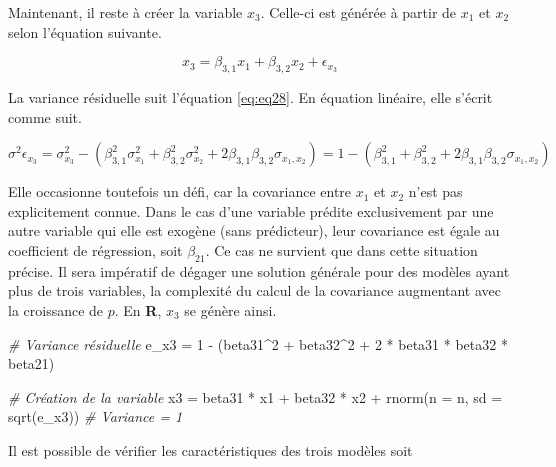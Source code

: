 \documentclass[
]{book}
\newenvironment{Shaded}{}{}
\newcommand{\AttributeTok}[1]{#1}
\newcommand{\CommentTok}[1]{\textit{#1}}
\newcommand{\DecValTok}[1]{#1}
\newcommand{\FunctionTok}[1]{#1}
\newcommand{\NormalTok}[1]{#1}
\newcommand{\OtherTok}[1]{#1}
\newcommand{\SpecialCharTok}[1]{#1}
\begin{document}
Maintenant, il reste à créer la variable \(x_3\). Celle-ci est générée à partir de \(x_1\) et \(x_2\) selon l'équation suivante.

\[
x_3 = \beta_{3,1}x_1 + \beta_{3,2}x_2 + \epsilon_{x_3}
\]

La variance résiduelle suit l'équation \eqref{eq:eq28}. En équation linéaire, elle s'écrit comme suit.

\[
\sigma^2{\epsilon_{x_3}} =\sigma^2_{x_3} -( \beta_{3,1}^2\sigma^2_{x_1} + \beta_{3,2}^2\sigma^2_{x_2}  +  2\beta_{3,1}\beta_{3,2}\sigma_{x_1,x_2}) = 1-(\beta_{3,1}^2+\beta_{3,2}^2  +  2\beta_{3,1}\beta_{3,2}\sigma_{x_1,x_2})
\]

Elle occasionne toutefois un défi, car la covariance entre \(x_1\) et \(x_2\) n'est pas explicitement connue. Dans le cas d'une variable prédite exclusivement par une autre variable qui elle est exogène (sans prédicteur), leur covariance est égale au coefficient de régression, soit \(\beta_{21}\). Ce cas ne survient que dans cette situation précise. Il sera impératif de dégager une solution générale pour des modèles ayant plus de trois variables, la complexité du calcul de la covariance augmentant avec la croissance de \(p\). En \textbf{R}, \(x_3\) se génère ainsi.

\begin{Shaded}
\begin{Highlighting}[]
\CommentTok{\# Variance résiduelle}
\NormalTok{e\_x3 }\OtherTok{=} \DecValTok{1} \SpecialCharTok{{-}}\NormalTok{ (beta31}\SpecialCharTok{\^{}}\DecValTok{2} \SpecialCharTok{+}\NormalTok{ beta32}\SpecialCharTok{\^{}}\DecValTok{2} \SpecialCharTok{+} \DecValTok{2} \SpecialCharTok{*}\NormalTok{ beta31 }\SpecialCharTok{*}\NormalTok{ beta32 }\SpecialCharTok{*}\NormalTok{ beta21)}

\CommentTok{\# Création de la variable}
\NormalTok{x3 }\OtherTok{=}\NormalTok{ beta31 }\SpecialCharTok{*}\NormalTok{ x1 }\SpecialCharTok{+}\NormalTok{ beta32 }\SpecialCharTok{*}\NormalTok{ x2 }\SpecialCharTok{+} \FunctionTok{rnorm}\NormalTok{(}\AttributeTok{n =}\NormalTok{ n,}
                                       \AttributeTok{sd =} \FunctionTok{sqrt}\NormalTok{(e\_x3)) }\CommentTok{\# Variance = 1}
\end{Highlighting}
\end{Shaded}

Il est possible de vérifier les caractéristiques des trois modèles soit
\end{document}
